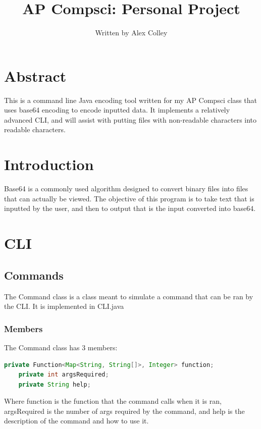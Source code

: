 \documentclass[12pt, letterpaper]{report}
\title{AP Compsci: Personal Project}
\author{Written by Alex Colley}
\begin{document}
\maketitle
\tableofcontents
\newpage
\chapter*{Abstract}
	This is a command line Java encoding tool written for my AP Compsci class that
uses base64 encoding to encode inputted data. It implements a relatively advanced CLI,
and will assist with putting files with non-readable characters into readable characters. 
\chapter*{Introduction}
	Base64 is a commonly used algorithm designed to convert binary files into files that
can actually be viewed. The objective of this program is to take text that is inputted by
the user, and then to output that is the input converted into base64.


\chapter{CLI} \label{chapter:1}
\section{Commands} \label{sec:1:1}
	The Command class is a class meant to simulate a command that can be ran by the 
	CLI. It is implemented in CLI.java
\subsection{Members} \label{sec:1:1:1}
	The Command class has 3 members:
\begin{lstlisting}[breaklines=true, language=Java, label=code:1:1:1:1]
	private Function<Map<String, String[]>, Integer> function;
	private int argsRequired;
	private String help;
\end{lstlisting}
Where function is the function that the command calls when it is ran, argsRequired is the
number of args required by the command, and help is the description of the command and how
to use it.
\end{document}
